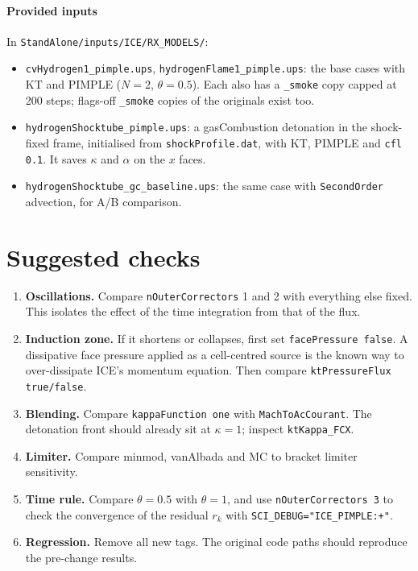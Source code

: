 \documentclass[11pt]{article}
\newcommand{\code}[1]{\texttt{\small #1}}
\newcommand{\file}[1]{\texttt{\small\color{Moss}#1}}
\begin{document}
\paragraph{Provided inputs} In \file{StandAlone/inputs/ICE/RX\_MODELS/}:
\begin{itemize}
  \item \code{cvHydrogen1\_pimple.ups}, \code{hydrogenFlame1\_pimple.ups}: the base cases with KT and PIMPLE
        ($N=2$, $\theta=0.5$). Each also has a \code{\_smoke} copy capped at 200 steps;
        flags-off \code{\_smoke} copies of the originals exist too.
  \item \code{hydrogenShocktube\_pimple.ups}: a gasCombustion detonation in the shock-fixed frame,
        initialised from \code{shockProfile.dat}, with KT, PIMPLE and \code{cfl 0.1}. It saves
        $\kappa$ and $\alpha$ on the $x$ faces.
  \item \code{hydrogenShocktube\_gc\_baseline.ups}: the same case with \code{SecondOrder}
        advection, for A/B comparison.
\end{itemize}

\section{Suggested checks}

\begin{enumerate}[leftmargin=*]
  \item \textbf{Oscillations.} Compare \code{nOuterCorrectors} 1 and 2 with everything else
        fixed. This isolates the effect of the time integration from that of the flux.
  \item \textbf{Induction zone.} If it shortens or collapses, first set
        \code{facePressure false}. A dissipative face pressure applied as a cell-centred
        source is the known way to over-dissipate ICE's momentum equation. Then compare
        \code{ktPressureFlux true/false}.
  \item \textbf{Blending.} Compare \code{kappaFunction one} with \code{MachToAcCourant}. The
        detonation front should already sit at $\kappa=1$; inspect \code{ktKappa\_FCX}.
  \item \textbf{Limiter.} Compare minmod, vanAlbada and MC to bracket limiter sensitivity.
  \item \textbf{Time rule.} Compare $\theta=0.5$ with $\theta=1$, and use \code{nOuterCorrectors 3} to check
        the convergence of the residual $r_k$ with \code{SCI\_DEBUG="ICE\_PIMPLE:+"}.
  \item \textbf{Regression.} Remove all new tags. The original code paths should reproduce
        the pre-change results.
\end{enumerate}
\end{document}
